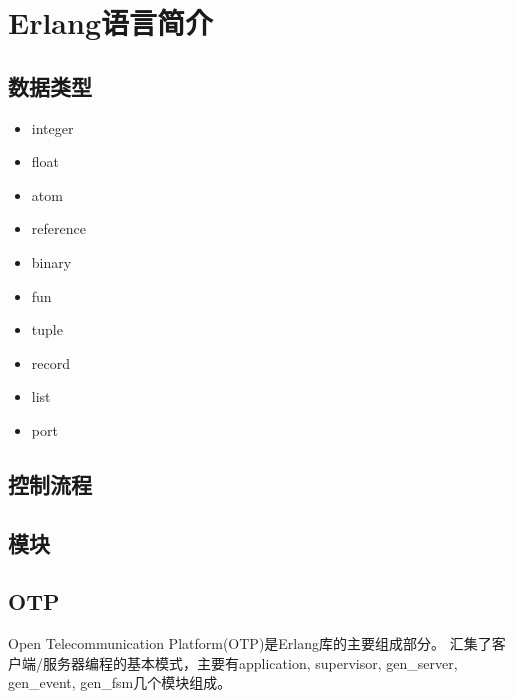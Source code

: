 \chapter{Erlang语言简介}

\section{数据类型}
\begin{itemize}
  \item integer
  \item float
  \item atom
  \item reference
  \item binary
  \item fun
  \item tuple
  \item record
  \item list
  \item port
\end{itemize}

\section{控制流程}

\section{模块}

\section{OTP}
Open Telecommunication Platform(OTP)是Erlang库的主要组成部分。
汇集了客户端/服务器编程的基本模式，主要有application, supervisor,
gen\_server, gen\_event, gen\_fsm几个模块组成。

